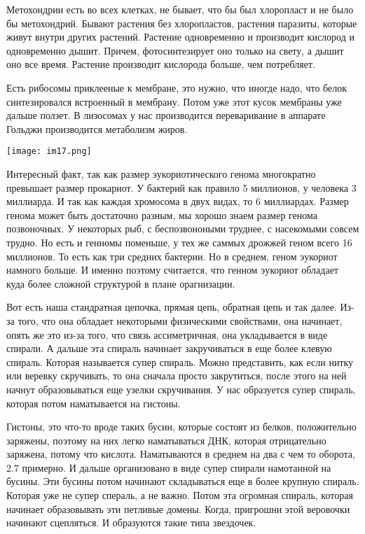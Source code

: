 Метохондрии есть во всех клетках, не бывает, что бы 
был хлоропласт и не было бы метохондрий. Бывают растения без хлоропластов, 
растения паразиты, которые живут внутри других растений. Растение одновременно и 
производит кислород и одновременно дышит. Причем, фотосинтезирует оно только на 
свету, а дышит оно все время. Растение производит кислорода больше, чем потребляет. 

Есть рибосомы приклееные к мембране, это нужно, что иногде надо, 
что белок синтезировался встроенный в мембрану. Потом уже этот 
кусок мембраны уже дальше ползет. В лизосомах 
у нас производится переваривание в аппарате Гольджи производится 
метаболизм жиров. 
  
\texttt{[image: im17.png]}

Интересный факт, так как размер эукориотического генома многократно 
превышает размер прокариот. У бактерий как правило 5 миллионов, у человека
3 миллиарда. И так как каждая хромосома в двух видах, то 
6 миллиардах. Размер генома может 
быть достаточно разным, мы хорошо знаем размер генома позвоночных. 
У некоторых рыб, с беспозвоноными труднее, с насекомыми совсем трудно. 
Но есть и генномы поменьше, у тех же саммых дрожжей геном всего 
16 миллионов. То есть как три средних бактерии. Но в среднем, 
геном эукориот намного больше. И именно поэтому считается, 
что генном эукориот обладает куда более сложной структурой в плане орагнизации. 

Вот есть наша стандратная цепочка, прямая цепь, обратная цепь и так далее. Из-за
того, что она обладает некоторыми физическими свойствами, она начинает, опять же 
это из-за того, что связь ассиметричная, она укладывается в виде спирали. 
А дальше эта спираль начинает закручиваться в еще более клевую спираль. Которая 
называется супер спираль. Можно представить, как если нитку или веревку скручивать, 
то она сначала просто закрутиться, после этого на ней начнут образовываться 
еще узелки скручивания. У нас образуется супер спираль, 
которая потом наматывается на гистоны. 

Гистоны, это что-то вроде таких бусин, 
которые состоят из белков, положительно заряжены, 
поэтому на них легко наматываться ДНК, которая 
отрицательно заряжена, потому что кислота. Наматываются 
в среднем на два с чем то оборота, 2.7 примерно. И дальше организовано 
в виде супер спирали намотанной на бусины. Эти бусины потом начинают складываться еще 
в более крупную спираль. Которая уже не супер спераль, а не важно. Потом эта огромная 
спираль, которая начинает образовывать эти 
петливые домены. Когда, пригрошни этой веровочки начинают сцепляться. И образуются 
такие типа звездочек. 

